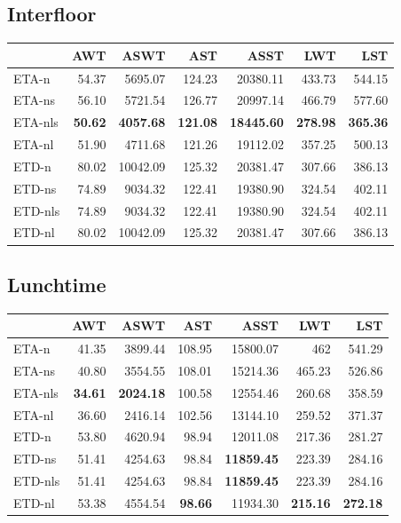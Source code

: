 \documentclass{UoYCSproject}
\begin{document}
\begin{appendices}
\subsection{Interfloor}
\begin{tabular}{l | r r r r r r}
	& AWT & ASWT & AST & ASST & LWT & LST \\
	\hline
    ETA-n & 54.37 & 5695.07 & 124.23 & 20380.11 & 433.73 & 544.15 \\
    ETA-ns & 56.10 & 5721.54 & 126.77 & 20997.14 & 466.79 & 577.60 \\
    ETA-nls & \textbf{50.62} & \textbf{4057.68} & \textbf{121.08} & \textbf{18445.60} & \textbf{278.98} & \textbf{365.36} \\
    ETA-nl & 51.90 & 4711.68 & 121.26 & 19112.02 & 357.25 & 500.13 \\
    ETD-n & 80.02 & 10042.09 & 125.32 & 20381.47 & 307.66 & 386.13 \\
    ETD-ns & 74.89 & 9034.32 & 122.41 & 19380.90 & 324.54 & 402.11 \\
    ETD-nls & 74.89 & 9034.32 & 122.41 & 19380.90 & 324.54 & 402.11 \\
    ETD-nl & 80.02 & 10042.09 & 125.32 & 20381.47 & 307.66 & 386.13
\end{tabular}

\subsection{Lunchtime}
\begin{tabular}{l | r r r r r r}
	& AWT & ASWT & AST & ASST & LWT & LST \\
	\hline
    ETA-n & 41.35 & 3899.44 & 108.95 & 15800.07 & 462 & 541.29 \\
    ETA-ns & 40.80 & 3554.55 & 108.01 & 15214.36 & 465.23 & 526.86 \\
    ETA-nls & \textbf{34.61} & \textbf{2024.18} & 100.58 & 12554.46 & 260.68 & 358.59 \\
    ETA-nl & 36.60 & 2416.14 & 102.56 & 13144.10 & 259.52 & 371.37 \\
    ETD-n & 53.80 & 4620.94 & 98.94 & 12011.08 & 217.36 & 281.27 \\
    ETD-ns & 51.41 & 4254.63 & 98.84 & \textbf{11859.45} & 223.39 & 284.16 \\
    ETD-nls & 51.41 & 4254.63 & 98.84 & \textbf{11859.45} & 223.39 & 284.16 \\
    ETD-nl & 53.38 & 4554.54 & \textbf{98.66} & 11934.30 & \textbf{215.16} & \textbf{272.18}
\end{tabular}


\end{appendices}
\end{document}
